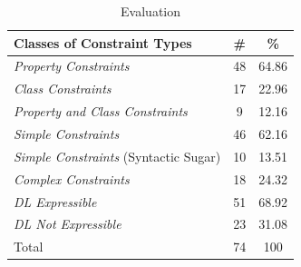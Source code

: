 \documentclass[a4paper,fontsize=11pt]{scrartcl}
\begin{document}
\begin{table}
  \vspace{0cm}
	\caption{Evaluation}
	\label{tab:evaluation}
	\centering
		\begin{tabular}{l|c|c}
      \textbf{Classes of Constraint Types} & \textbf{\#} & \textbf{\%} \\
      \hline
\emph{Property Constraints} & 48 & 64.86 \\
\emph{Class Constraints} & 17 & 22.96 \\
\emph{Property and Class Constraints} & 9 & 12.16 \\
\hline
\emph{Simple Constraints} & 46 & 62.16 \\
\emph{Simple Constraints} (Syntactic Sugar) & 10 & 13.51 \\
\emph{Complex Constraints} & 18 & 24.32 \\
\hline
\emph{DL Expressible} & 51 & 68.92 \\
\emph{DL Not Expressible} & 23 & 31.08 \\
\hline
Total & 74 & 100 \\
		\end{tabular}
\end{table}

%
\end{document}
